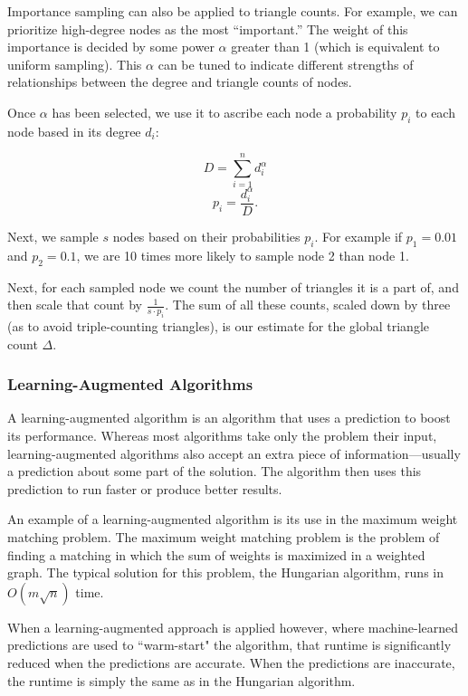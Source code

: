 \documentclass[11pt]{article}
\begin{document}
Importance sampling can also be applied to triangle counts.
For example, we can prioritize high-degree nodes as the most ``important.''
The weight of this importance is decided by some power $\alpha$ greater than 1 (which is equivalent to uniform sampling).
This $\alpha$ can be tuned to indicate different strengths of relationships between the degree and triangle counts of nodes. 

Once $\alpha$ has been selected, we use it to ascribe each node a probability $p_i$ to each node based in its degree $d_i$:

\[
D = \sum_{i = 1}^{n} d_i^\alpha
\]
\[
p_i = \frac{d_i^\alpha}{D}.
\]

Next, we sample $s$ nodes based on their probabilities $p_i$.
For example if $p_1 = 0.01$ and $p_2 = 0.1$, we are 10 times more likely to sample node 2 than node 1.

Next, for each sampled node we count the number of triangles it is a part of, and then scale that count by $\frac{1}{s \cdot p_i}$.
The sum of all these counts, scaled down by three (as to avoid triple-counting triangles), is our estimate for the global triangle count $\Delta$.

\subsubsection{Learning-Augmented Algorithms}

A learning-augmented algorithm \cite{roughgarden_algorithms_2020} is an algorithm that uses a prediction to boost its performance.
Whereas most algorithms take only the problem their input, learning-augmented algorithms also accept an extra piece of information—usually a prediction about some part of the solution.
The algorithm then uses this prediction to run faster or produce better results.

An example of a learning-augmented algorithm is its use in the maximum weight matching problem.
The maximum weight matching problem \cite{duan_linear-time_2014} is the problem of finding a matching in which the sum of weights is maximized in a weighted graph.
The typical solution for this problem, the Hungarian algorithm, runs in $O(m\sqrt{n})$ time.

When a learning-augmented approach \cite{dinitz_faster_2021} is applied however, where machine-learned predictions are used to ``warm-start" the algorithm, that runtime is significantly reduced when the predictions are accurate.
When the predictions are inaccurate, the runtime is simply the same as in the Hungarian algorithm.
\end{document}
